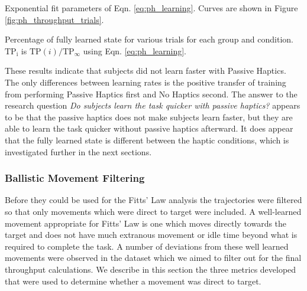 \begin{table}
    \centering
    \caption{Exponential fit parameters of Eqn. \ref{eq:ph_learning}. Curves are shown in Figure \ref{fig:ph_throughput_trials}.}
    \label{tab:ph_tp_regression}
\end{table}

\begin{table}
    \centering
    \caption{Percentage of fully learned state for various trials for each group and condition. $\mathrm{TP_i}$ is $\mathrm{TP}(i)/\mathrm{TP}_{\infty}$ using Eqn. \ref{eq:ph_learning}.}
    \label{tab:ph_tp_regression_values}
\end{table}

These results indicate that subjects did not learn faster with Passive Haptics.
The only differences between learning rates is the positive transfer of training from performing Passive Haptics first and No Haptics second.
The answer to the research question \textit{Do subjects learn the task quicker with passive haptics?} appears to be that the passive haptics does not make subjects learn faster, but they are able to learn the task quicker without passive haptics afterward.
It does appear that the fully learned state is different between the haptic conditions, which is investigated further in the next sections.

\subsubsection{Ballistic Movement Filtering}
\label{sec:ph_ballistic_filter}

Before they could be used for the Fitts' Law analysis the trajectories were filtered so that only movements which were direct to target were included.
A well-learned movement appropriate for Fitts' Law is one which moves directly towards the target and does not have much extranous movement or idle time beyond what is required to complete the task.
A number of deviations from these well learned movements were observed in the dataset which we aimed to filter out for the final throughput calculations.
We describe in this section the three metrics developed that were used to determine whether a movement was direct to target.


